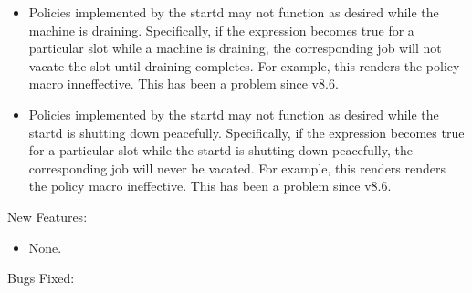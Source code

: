 \begin{itemize}

\item Policies implemented by the startd may not function as desired while
the machine is draining.  Specifically, if the  expression
becomes true for a particular slot while a machine is draining, the
corresponding job will not vacate the slot until draining completes.  For
example, this renders the policy macro 
inneffective.  This has been a problem since v8.6.

\item Policies implemented by the startd may not function as desired while
the startd is shutting down peacefully.  Specifically, if the 
expression becomes true for a particular slot while the startd is shutting
down peacefully, the corresponding job will never be vacated.  For example,
this renders renders the policy macro 
ineffective.  This has been a problem since v8.6.

\end{itemize}

\noindent New Features:

\begin{itemize}

\item None.

\end{itemize}

\noindent Bugs Fixed:

